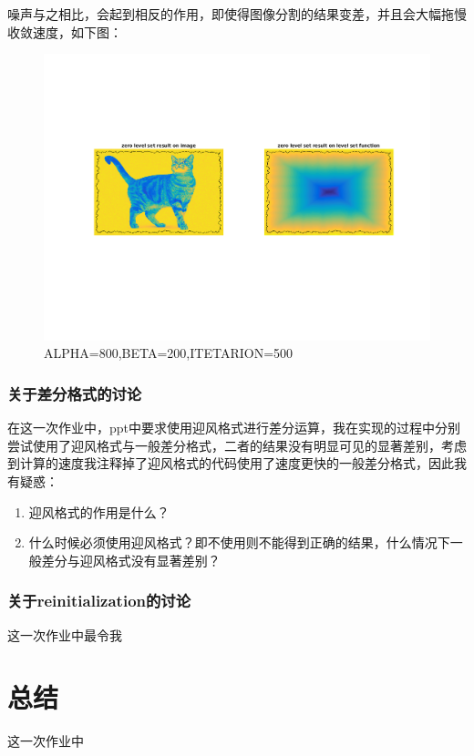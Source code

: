 \documentclass[a4paper, UTF8]{ctexrep}
\begin{document}
			\clearpage
			噪声与之相比，会起到相反的作用，即使得图像分割的结果变差，并且会大幅拖慢收敛速度，如下图：
			\begin{figure}[htbp!]
				\centering
				\includegraphics[width=\textwidth]{hw3_fig13.png}
				\caption{ALPHA=800,BETA=200,ITETARION=500}
				\label{fig:figure1}
			\end{figure}

		\subsubsection{关于差分格式的讨论} %
		\label{ssub:关于差分格式的讨论}
			在这一次作业中，ppt中要求使用迎风格式进行差分运算，我在实现的过程中分别尝试使用了迎风格式与一般差分格式，二者的结果没有明显可见的显著差别，考虑到计算的速度我注释掉了迎风格式的代码使用了速度更快的一般差分格式，因此我有疑惑：
			\begin{enumerate}
				\item 迎风格式的作用是什么？
				\item 什么时候必须使用迎风格式？即不使用则不能得到正确的结果，什么情况下一般差分与迎风格式没有显著差别？
			\end{enumerate}
		\subsubsection{关于reinitialization的讨论} %
		\label{ssub:关于reinitialization的讨论}
			这一次作业中最令我
	\section{总结} %
	\label{sec:总结}
		这一次作业中

	    
\end{document}
